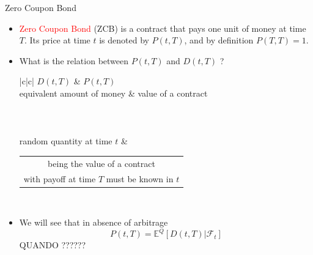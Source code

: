 \documentclass{beamer}
\begin{document}
\begin{frame}{Zero Coupon Bond}
	\begin{itemize}
		\item \textcolor{red}{Zero Coupon Bond} (ZCB) is a contract that pays one unit of money at time $T$. Its price at time $t$ is denoted by $P(t,T)$, and by definition $P(T,T) = 1$.
		\item What is the relation between $P(t,T)$ and $D(t,T)$ ? \\
		\renewcommand{\arraystretch}{1.2}
		\footnotesize{\tiny {\tiny }}{
			\begin{table}[bt]
				\begin{tabular}{|c|c|} \hline
					$D(t, T)$ & $P(t, T)$ \\ \hline
					equivalent amount of money & value of a contract \\ \hline
					 \\ \hline
					 \\ \hline 
					 \\ \hline
					random quantity at time $t$ &
					\renewcommand{\arraystretch}{1.0} 
					\begin{tabular}{@{}c@{}}
						being the value of a contract\\ with payoff at time $T$ must be known in $t$ \\
					\end{tabular} \\ \hline
				\end{tabular}
			\end{table}
		}
		\item We will see that in absence of arbitrage
		\begin{equation*}
			P(t, T) = \mathbb{E}^Q[D(t, T)|\mathcal{F}_t]
		\end{equation*}	
	QUANDO ??????
	\end{itemize}
\end{frame}
\end{document}
